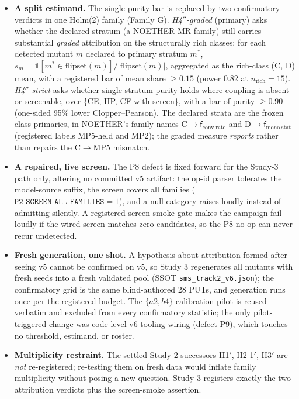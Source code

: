 \documentclass[manuscript,screen,review]{acmart}
\begin{document}
\begin{itemize}

\item
  \textbf{A split estimand.} The single purity bar is replaced by two
  confirmatory verdicts in one Holm(2) family (Family G). \emph{H4\('' \)-graded}
  (primary) asks whether the declared stratum (a NOETHER MR family) still carries substantial
  \emph{graded} attribution on the structurally rich classes: for each detected
  mutant \(m\) declared to primary stratum \(m^{*}\),
  \(s_m = \mathbb{1}[m^{*}\in\mathrm{flipset}(m)]/|\mathrm{flipset}(m)|\),
  aggregated as the rich-class (C, D) mean, with a registered bar of mean share
  \(\geq 0.15\) (power 0.82 at \(n_{\mathrm{rich}}=15\)). \emph{H4\('' \)-strict}
  asks whether single-stratum purity holds where coupling is absent or
  screenable, over \{CE, HP, CF-with-screen\}, with a bar of purity \(\geq 0.90\)
  (one-sided 95\% lower Clopper--Pearson). The declared strata are the frozen
  class-primaries, in NOETHER's family names
  C\(\to \mathsf{f}_{\mathrm{conv.rate}}\) and
  D\(\to \mathsf{f}_{\mathrm{mono.stat}}\) (registered labels MP5-held and MP2); the graded
  measure \emph{reports} rather than repairs the C\(\to\)MP5 mismatch.
\item
  \textbf{A repaired, live screen.} The P8 defect is fixed forward for the
  Study-3 path only, altering no committed v5 artifact: the op-id parser
  tolerates the model-source suffix, the screen covers all families
  (\(\texttt{P2\_SCREEN\_ALL\_FAMILIES}=1\)), and a null category raises loudly
  instead of admitting silently. A registered screen-smoke gate makes the
  campaign fail loudly if the wired screen matches zero candidates, so the P8
  no-op can never recur undetected.
\item
  \textbf{Fresh generation, one shot.} A hypothesis about attribution formed
  after seeing v5 cannot be confirmed on v5, so Study 3 regenerates all mutants
  with fresh seeds into a fresh validated pool (SSOT
  \texttt{sms\_track2\_v6.json}); the confirmatory grid is the same
  blind-authored 28 PUTs, and generation runs once per the registered budget.
  The \(\{a2, b4\}\) calibration pilot is reused verbatim and excluded from
  every confirmatory statistic; the only pilot-triggered change was code-level
  v6 tooling wiring (defect P9), which touches no threshold, estimand, or
  roster.
\item
  \textbf{Multiplicity restraint.} The settled Study-2 successors H1\('\),
  H2-1\('\), H3\('\) are \emph{not} re-registered; re-testing them on fresh data
  would inflate family multiplicity without posing a new question. Study 3
  registers exactly the two attribution verdicts plus the screen-smoke
  assertion.
\end{itemize}
\end{document}
